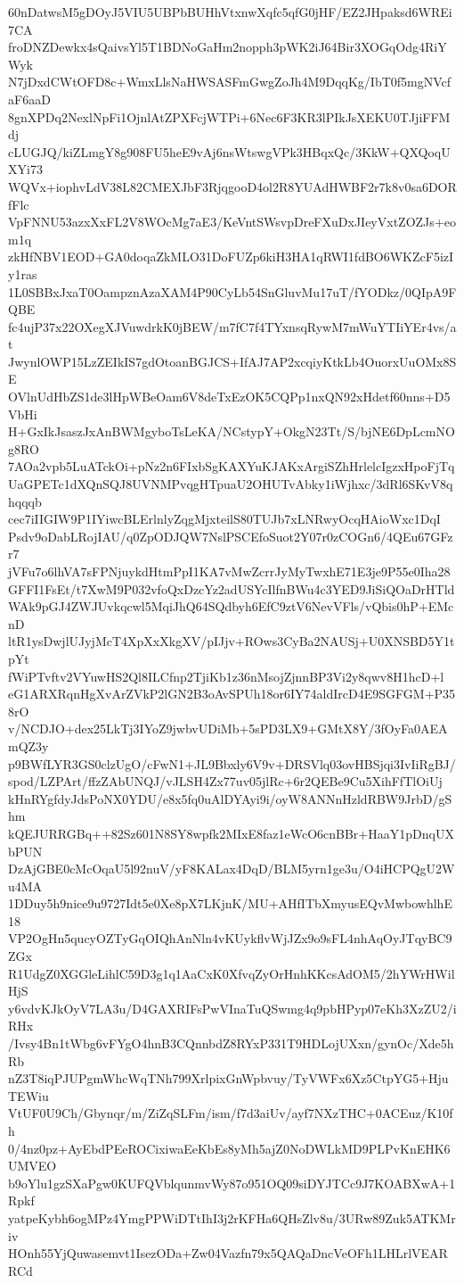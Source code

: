 60nDatwsM5gDOyJ5VIU5UBPbBUHhVtxnwXqfc5qfG0jHF/EZ2JHpaksd6WREi7CA
froDNZDewkx4sQaivsYl5T1BDNoGaHm2nopph3pWK2iJ64Bir3XOGqOdg4RiYWyk
N7jDxdCWtOFD8c+WmxLlsNaHWSASFmGwgZoJh4M9DqqKg/IbT0f5mgNVcfaF6aaD
8gnXPDq2NexlNpFi1OjnlAtZPXFcjWTPi+6Nec6F3KR3lPIkJsXEKU0TJjiFFMdj
cLUGJQ/kiZLmgY8g908FU5heE9vAj6nsWtswgVPk3HBqxQc/3KkW+QXQoqUXYi73
WQVx+iophvLdV38L82CMEXJbF3RjqgooD4ol2R8YUAdHWBF2r7k8v0sa6DORfFlc
VpFNNU53azxXxFL2V8WOcMg7aE3/KeVntSWsvpDreFXuDxJIeyVxtZOZJs+eom1q
zkHfNBV1EOD+GA0doqaZkMLO31DoFUZp6kiH3HA1qRWI1fdBO6WKZcF5izIy1ras
1L0SBBxJxaT0OampznAzaXAM4P90CyLb54SnGluvMu17uT/fYODkz/0QIpA9FQBE
fc4ujP37x22OXegXJVuwdrkK0jBEW/m7fC7f4TYxnsqRywM7mWuYTIiYEr4vs/at
JwynlOWP15LzZEIkIS7gdOtoanBGJCS+IfAJ7AP2xcqiyKtkLb4OuorxUuOMx8SE
OVlnUdHbZS1de3lHpWBeOam6V8deTxEzOK5CQPp1nxQN92xHdetf60nns+D5VbHi
H+GxIkJsaszJxAnBWMgyboTsLeKA/NCstypY+OkgN23Tt/S/bjNE6DpLcmNOg8RO
7AOa2vpb5LuATckOi+pNz2n6FIxbSgKAXYuKJAKxArgiSZhHrlelcIgzxHpoFjTq
UaGPETc1dXQnSQJ8UVNMPvqgHTpuaU2OHUTvAbky1iWjhxc/3dRl6SKvV8qhqqqb
cec7iIIGIW9P1IYiwcBLErlnlyZqgMjxteilS80TUJb7xLNRwyOcqHAioWxc1DqI
Psdv9oDabLRojIAU/q0ZpODJQW7NslPSCEfoSuot2Y07r0zCOGn6/4QEu67GFzr7
jVFu7o6lhVA7sFPNjuykdHtmPpI1KA7vMwZcrrJyMyTwxhE71E3je9P55e0Iha28
GFFI1FsEt/t7XwM9P032vfoQxDzcYz2adUSYcIlfnBWu4c3YED9JiSiQOaDrHTld
WAk9pGJ4ZWJUvkqcwl5MqiJhQ64SQdbyh6EfC9ztV6NevVFls/vQbis0hP+EMcnD
ltR1ysDwjlUJyjMcT4XpXxXkgXV/pIJjv+ROws3CyBa2NAUSj+U0XNSBD5Y1tpYt
fWiPTvftv2VYuwHS2Ql8ILCfnp2TjiKb1z36nMsojZjnnBP3Vi2y8qwv8H1hcD+l
eG1ARXRqnHgXvArZVkP2lGN2B3oAvSPUh18or6IY74aldIrcD4E9SGFGM+P358rO
v/NCDJO+dex25LkTj3IYoZ9jwbvUDiMb+5sPD3LX9+GMtX8Y/3fOyFa0AEAmQZ3y
p9BWfLYR3GS0clzUgO/cFwN1+JL9Bbxly6V9v+DRSVlq03ovHBSjqi3IvIiRgBJ/
spod/LZPArt/ffzZAbUNQJ/vJLSH4Zx77uv05jlRc+6r2QEBe9Cu5XihFfTlOiUj
kHnRYgfdyJdsPoNX0YDU/e8x5fq0uAlDYAyi9i/oyW8ANNnHzldRBW9JrbD/gShm
kQEJURRGBq++82Sz601N8SY8wpfk2MIxE8faz1eWcO6cnBBr+HaaY1pDnqUXbPUN
DzAjGBE0cMcOqaU5l92nuV/yF8KALax4DqD/BLM5yrn1ge3u/O4iHCPQgU2Wu4MA
1DDuy5h9nice9u9727Idt5e0Xe8pX7LKjnK/MU+AHfITbXmyusEQvMwbowhlhE18
VP2OgHn5qucyOZTyGqOIQhAnNln4vKUykflvWjJZx9o9sFL4nhAqOyJTqyBC9ZGx
R1UdgZ0XGGleLihlC59D3g1q1AaCxK0XfvqZyOrHnhKKcsAdOM5/2hYWrHWilHjS
y6vdvKJkOyV7LA3u/D4GAXRIFsPwVInaTuQSwmg4q9pbHPyp07eKh3XzZU2/iRHx
/Ivsy4Bn1tWbg6vFYgO4hnB3CQnnbdZ8RYxP331T9HDLojUXxn/gynOc/Xde5hRb
nZ3T8iqPJUPgmWhcWqTNh799XrlpixGnWpbvuy/TyVWFx6Xz5CtpYG5+HjuTEWiu
VtUF0U9Ch/Gbynqr/m/ZiZqSLFm/ism/f7d3aiUv/ayf7NXzTHC+0ACEuz/K10fh
0/4nz0pz+AyEbdPEeROCixiwaEeKbEs8yMh5ajZ0NoDWLkMD9PLPvKnEHK6UMVEO
b9oYlu1gzSXaPgw0KUFQVblqunmvWy87o951OQ09siDYJTCc9J7KOABXwA+1Rpkf
yatpeKybh6ogMPz4YmgPPWiDTtIhI3j2rKFHa6QHsZlv8u/3URw89Zuk5ATKMriv
HOnh55YjQuwasemvt1IsezODa+Zw04Vazfn79x5QAQaDncVeOFh1LHLrlVEARRCd
